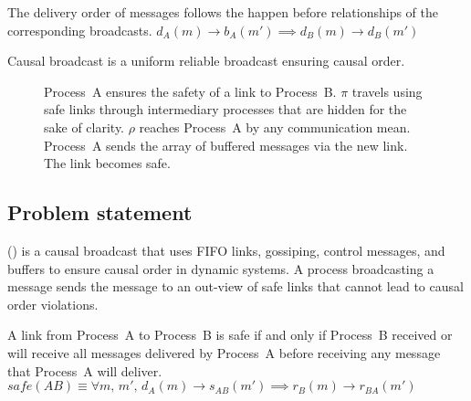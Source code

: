 

\begin{definition}
  The delivery order of messages follows the happen before relationships of the
  corresponding broadcasts.
  $d_A(m) \rightarrow b_A(m') \implies d_B(m) \rightarrow d_B(m')$
\end{definition}

\begin{definition}
  Causal broadcast is a uniform reliable broadcast ensuring causal order.
\end{definition}



\begin{figure}
  \begin{center}
    
    \caption{\label{fig:timelinepcbroadcast}Process~A ensures the safety of a
      link to Process~B. $\pi$ travels using safe links through intermediary
      processes that are hidden for the sake of clarity. $\rho$ reaches
      Process~A by any communication mean. Process~A sends the array of buffered
      messages via the new link. The link becomes safe.}
  \end{center}
\end{figure}

\subsection{Problem statement}
\label{subsec:problemstatement}

\PCBROADCAST (\REF) is a causal broadcast that uses FIFO links, gossiping,
control messages, and buffers to ensure causal order in dynamic systems. A
process broadcasting a message sends the message to an out-view of safe links
that cannot lead to causal order violations.

\begin{definition}  
  A link from Process~A to Process~B is safe if and only if Process~B received
  or will receive all messages delivered by Process~A before receiving any
  message that Process~A will
  deliver. $safe(AB) \equiv \forall m,\, m',\, d_A(m) \rightarrow s_{AB}(m')
  \implies r_B(m) \rightarrow r_{BA}(m')$
\end{definition}

